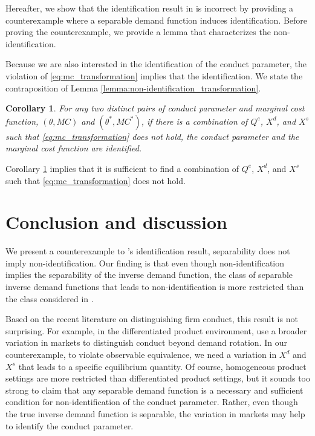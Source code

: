 \documentclass[11pt, a4paper]{article}
\newtheorem{corollary}{Corollary}
\theoremstyle{remark}
\begin{document}
Hereafter, we show that the identification result in \citet{lau1982identifying} is incorrect by providing a counterexample where a separable demand function induces identification.
Before proving the counterexample, we provide a lemma that characterizes the non-identification.




Because we are also interested in the identification of the conduct parameter, the violation of \eqref{eq:mc_transformation} implies that the identification.
We state the contraposition of Lemma \ref{lemma:non-identification_transformation}.
\begin{corollary}\label{corollary:identification}
    For any two distinct pairs of conduct parameter and marginal cost function, $(\theta, MC)$ and $(\theta^{*}, MC^{*})$, if there is a combination of $Q^e$, $X^{d}$, and $X^{s}$ such that \eqref{eq:mc_transformation} does not hold, the conduct parameter and the marginal cost function are identified.
\end{corollary}


Corollary \ref{corollary:identification} implies that it is sufficient to find a combination of $Q^e$, $X^{d}$, and $X^{s}$ such that \eqref{eq:mc_transformation} does not hold.










\section{Conclusion and discussion}

We present a counterexample to \citet{lau1982identifying}'s identification result, separability does not imply non-identification.
Our finding is that even though non-identification implies the separability of the inverse demand function, the class of separable inverse demand functions that leads to non-identification is more restricted than the class considered in \citet{lau1982identifying}.

Based on the recent literature on distinguishing firm conduct, this result is not surprising.
For example, in the differentiated product environment, \citet{berry2014identification}  use a broader variation in markets to distinguish conduct beyond demand rotation.
In our counterexample, to violate observable equivalence, we need a variation in $X^{d}$ and $X^{s}$ that leads to a specific equilibrium quantity.
Of course, homogeneous product settings are more restricted than differentiated product settings, but it sounds too strong to claim that any separable demand function is a necessary and sufficient condition for non-identification of the conduct parameter.
Rather, even though the true inverse demand function is separable, the variation in markets may help to identify the conduct parameter.
\end{document}
